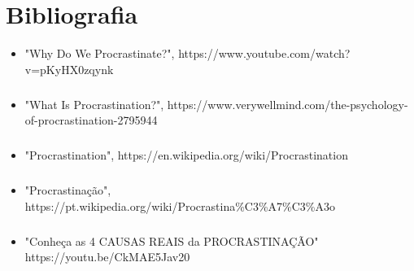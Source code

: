 \documentclass{report}
\begin{document}
\chapter*{Bibliografia}
\begin{flushleft}
\begin{itemize}
\paragraph{}
\item "Why Do We Procrastinate?",
https://www.youtube.com/watch?v=pKyHX0zqynk
\paragraph{}
\item"What Is Procrastination?",
https://www.verywellmind.com/the-psychology-of-procrastination-2795944
\paragraph{}
\item"Procrastination",
https://en.wikipedia.org/wiki/Procrastination
\paragraph{}
\item"Procrastinação",
https://pt.wikipedia.org/wiki/Procrastina\%C3\%A7\%C3\%A3o
\paragraph{}
\item"Conheça as 4 CAUSAS REAIS da PROCRASTINAÇÃO"
https://youtu.be/CkMAE5Jav20
 \end{itemize}

\end{flushleft}


\printbibliography
\end{document}
